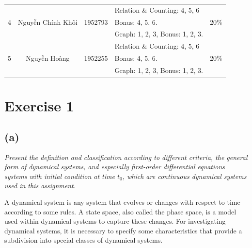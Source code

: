 \documentclass[a4paper]{article}
\begin{document}
\begin{center}
\begin{tabular}{|c|c|c|l|c|}
    \hline
    \multirow{3}{*}{4} & \multirow{3}{*}{Nguyễn Chính Khôi}     & \multirow{3}{*}{1952793} & \textendash{} Relation \& Counting: 4, 5, 6   & \multirow{3}{*}{20\%}       \\
                       &                                        &                          & Bonus: 4, 5, 6.                               &                             \\
                       &                                        &                          & \textendash{} Graph: 1, 2, 3, Bonus: 1, 2, 3. &                             \\
    \hline
    \multirow{3}{*}{5} & \multirow{3}{*}{Nguyễn Hoàng}          & \multirow{3}{*}{1952255} & \textendash{} Relation \& Counting: 4, 5, 6   & \multirow{3}{*}{20\%}       \\
                       &                                        &                          & Bonus: 4, 5, 6.                               &                             \\
                       &                                        &                          & \textendash{} Graph: 1, 2, 3, Bonus: 1, 2, 3. &                             \\
    \hline
  \end{tabular}
\end{center}


\newpage
\section{Exercise 1}
\subsection{(a)}
\textit{Present the definition and classification according to different criteria, the general form of dynamical systems, and especially first-order differential equations systems with initial condition at time \(t_0\), which are continuous dynamical systems used in this assignment.}


A dynamical system is any system that evolves or changes with respect to time according to some rules.
A state space, also called the phase space, is a model used within dynamical systems to capture these changes.
For investigating dynamical systems, it is necessary to specify some characteristics that provide a subdivision into special classes of dynamical systems.
\end{document}
